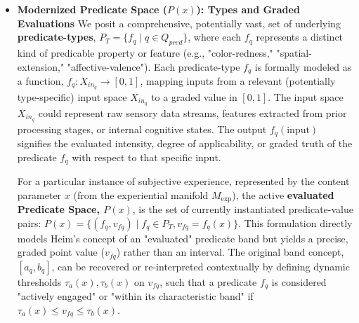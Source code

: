 \documentclass[
    12pt,              %
    a4paper,           %
    headings=normal,   %
    twoside=true,      %
    BCOR=8mm,          %
]{scrbook}
\newcommand{\Mexp}{M_{\text{exp}}}
\begin{document}
\begin{itemize}
    \item   \textbf{Modernized Predicate Space (\(P(x)\)): Types and Graded Evaluations}
        We posit a comprehensive, potentially vast, set of underlying \textbf{predicate-types}, \(P_T = \{ f_q \mid q \in Q_{pred} \}\), where each \(f_q\) represents a distinct kind of predicable property or feature (e.g., "color-redness," "spatial-extension," "affective-valence"). Each predicate-type \(f_q\) is formally modeled as a function, \(f_q: X_{in_q} \to [0,1]\), mapping inputs from a relevant (potentially type-specific) input space \(X_{in_q}\) to a graded value in \([0,1]\). The input space \(X_{in_q}\) could represent raw sensory data streams, features extracted from prior processing stages, or internal cognitive states. The output \(f_q(\text{input})\) signifies the evaluated intensity, degree of applicability, or graded truth of the predicate \(f_q\) with respect to that specific input.

        For a particular instance of subjective experience, represented by the content parameter \(x\) (from the experiential manifold \(\Mexp\)), the active \textbf{evaluated Predicate Space, \(P(x)\)}, is the set of currently instantiated predicate-value pairs: \(P(x) = \{ (f_q, v_{fq}) \mid f_q \in P_T, v_{fq} = f_q(x) \}\). This formulation directly models Heim's concept of an "evaluated" predicate band but yields a precise, graded point value (\(v_{fq}\)) rather than an interval. The original band concept, \([a_q, b_q]\), can be recovered or re-interpreted contextually by defining dynamic thresholds \(\tau_a(x), \tau_b(x)\) on \(v_{fq}\), such that a predicate \(f_q\) is considered "actively engaged" or "within its characteristic band" if \(\tau_a(x) \le v_{fq} \le \tau_b(x)\).


\end{itemize}
\end{document}
